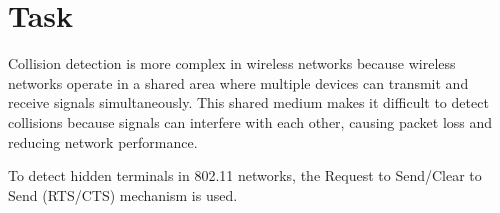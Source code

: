 \documentclass[11pt]{article}
\begin{document}
    \newpage
    \section{Task}\label{sec:task-4}
    Collision detection is more complex in wireless networks because wireless networks operate in a shared area
    where multiple devices can transmit and receive signals simultaneously.
    This shared medium makes it difficult to detect collisions because signals can interfere with each other,
    causing packet loss and reducing network performance.

    To detect hidden terminals in 802.11 networks, the Request to Send/Clear to Send (RTS/CTS) mechanism is used.
\end{document}

